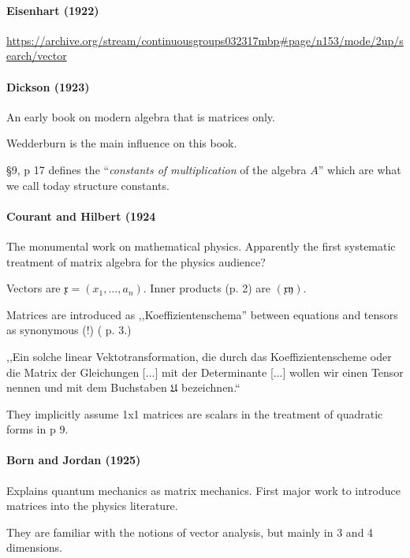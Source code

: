 \paragraph{Eisenhart (1922)}

\url{https://archive.org/stream/continuousgroups032317mbp#page/n153/mode/2up/search/vector}


\paragraph{Dickson (1923)~\cite{Dickson1923}}

An early book on modern algebra that is matrices only.

Wedderburn is the main influence on this book.

\S 9, p 17 defines the ``\textit{constants of multiplication} of the algebra $A$''
which are what we call today structure constants.

\paragraph{Courant and Hilbert (1924~\cite{Courant1924}}

The monumental work on mathematical physics. Apparently the first systematic treatment of matrix algebra for the physics audience?

Vectors are $\mathfrak x = (x_1, \dots, a_n)$. Inner products (p. 2) are $(\mathfrak x \mathfrak y)$.

Matrices are introduced as ,,Koeffizientenschema'' between equations and tensors as synonymous (!) ( p. 3.)

,,Ein solche linear Vektotransformation, die durch das Koeffizientenscheme oder die Matrix der Gleichungen [...] mit der Determinante [...] wollen wir einen Tensor nennen und mit dem Buchstaben $\mathfrak U$ bezeichnen.``

They implicitly assume 1x1 matrices are scalars in the treatment of quadratic forms in p 9.


\paragraph{Born and Jordan (1925)~\cite{Born1925}}

Explains quantum mechanics as matrix mechanics. First major work to introduce matrices into the physics literature.

They are familiar with the notions of vector analysis, but mainly in 3 and 4 dimensions.


